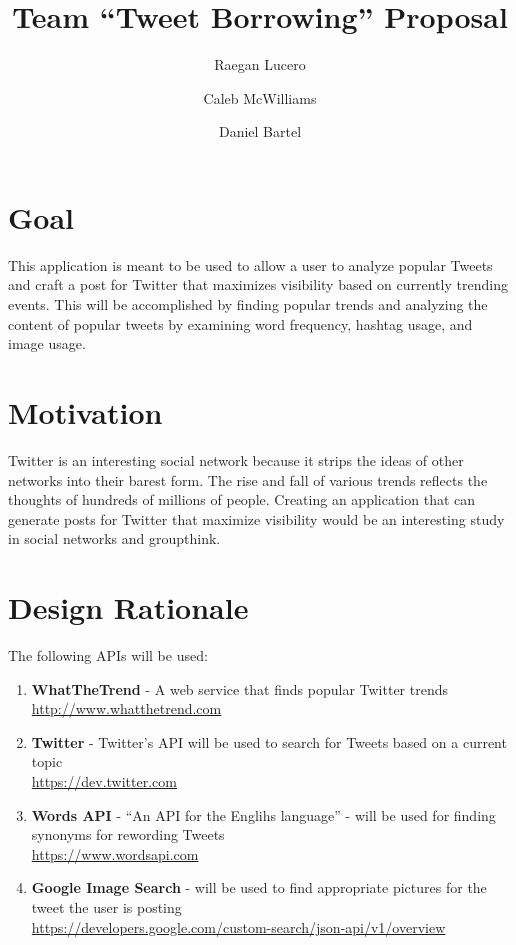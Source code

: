 \documentclass{article}
\title{Team ``Tweet Borrowing'' Proposal}
\date{}
\author{
	Raegan Lucero
	\and
	 Caleb McWilliams
	\and
	 Daniel Bartel
 }
\begin{document}
\maketitle

\section*{Goal}

This application is meant to be used to allow a user to analyze popular Tweets and craft a post for Twitter that maximizes visibility 
based on currently trending events. This will be accomplished by finding popular trends and analyzing the content of popular tweets by examining word frequency, hashtag usage, and image usage. 

\section*{Motivation}

Twitter is an interesting social network because it strips the ideas of other networks into their barest form.
The rise and fall of various trends reflects the thoughts of hundreds of millions of people.
Creating an application that can generate posts for Twitter that maximize visibility would be an interesting study in 
social networks and groupthink.

\section*{Design Rationale}

The following APIs will be used:
\begin{enumerate}
  \item[\textbullet] \textbf{WhatTheTrend} - A web service that finds popular Twitter trends \\
    \url{http://www.whatthetrend.com}
  \item[\textbullet] \textbf{Twitter} - Twitter's API will be used to search for Tweets based on a current topic \\
    \url{https://dev.twitter.com}
  \item[\textbullet] \textbf{Words API} - ``An API for the Englihs language'' - will be used for finding synonyms for rewording Tweets \\ 
    \url{https://www.wordsapi.com}
  \item[\textbullet] \textbf{Google Image Search} - will be used to find appropriate pictures for the tweet the user is posting \\
    \url{https://developers.google.com/custom-search/json-api/v1/overview}
\end{enumerate}
	
\end{document}
